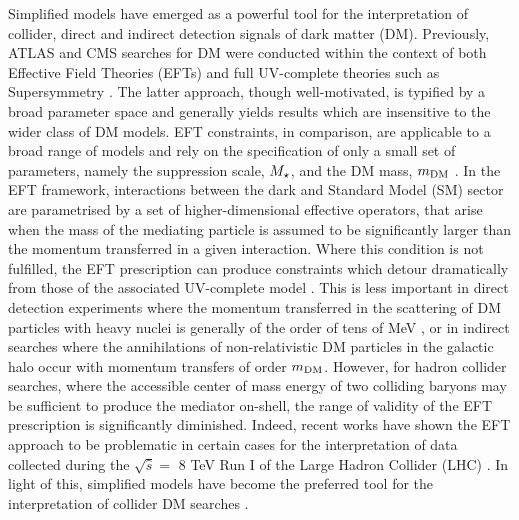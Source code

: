 
Simplified models have emerged as a powerful tool for the interpretation of collider, direct and indirect detection signals of dark matter (DM). Previously, ATLAS and CMS searches for DM were conducted within the context of both Effective Field Theories (EFTs) \cite{Aad:1363019, ATLAS-CONF-2012-147, CMS-PAS-EXO-12-048, Abdallah:1472683} and full UV-complete theories such as Supersymmetry \cite{Aad:2012ms, Aad:2012fqa, Aad:2014wea, SUSY_official_paper}. The latter approach, though well-motivated, is typified by a broad parameter space and generally yields results which are insensitive to the wider class of DM models. EFT constraints, in comparison, are applicable to a broad range of models and rely on the specification of only a small set of parameters, namely the suppression scale, $M_{\star}$, and the DM mass, $m_{\mathrm{DM}}$ \cite{DMCons2}.
In the EFT framework, interactions between the dark and Standard Model (SM) sector are parametrised by a set of higher-dimensional effective operators, that arise when the mass of the mediating particle is assumed to be significantly larger than the momentum transferred in a given interaction. Where this condition is not fulfilled, the EFT prescription can produce constraints which detour dramatically from those of the associated UV-complete model \cite{Bai:2010hh, DMCons2, Fox:2011fx, Graesser:2011vj, An:2011ck}. This is less important in direct detection experiments where the momentum transferred in the scattering of DM particles with heavy nuclei is generally of the order of tens of MeV \cite{EFTDM, DMCons3}, or in indirect searches where the annihilations of non-relativistic DM particles in the galactic halo occur with momentum transfers of order $m_{\mathrm{DM}}$. However, for hadron collider searches, where the accessible center of mass energy of two colliding baryons may be sufficient to produce the mediator on-shell, the range of validity of the EFT prescription is significantly diminished. Indeed, recent works have shown the EFT approach to be problematic in certain cases for the interpretation of data collected during the $\sqrt{\hat{s}} =$ 8 TeV Run I of the Large Hadron Collider (LHC) \cite{ValidEFT, ValidEFT_part2, ValidEFT_part3}. In light of this, simplified models have become the preferred tool for the interpretation of collider DM searches \cite{DM_MET_LHC, DMOxfordReport, DMForumReport, Harris:2014hga,Buchmueller:2014yoa}.

